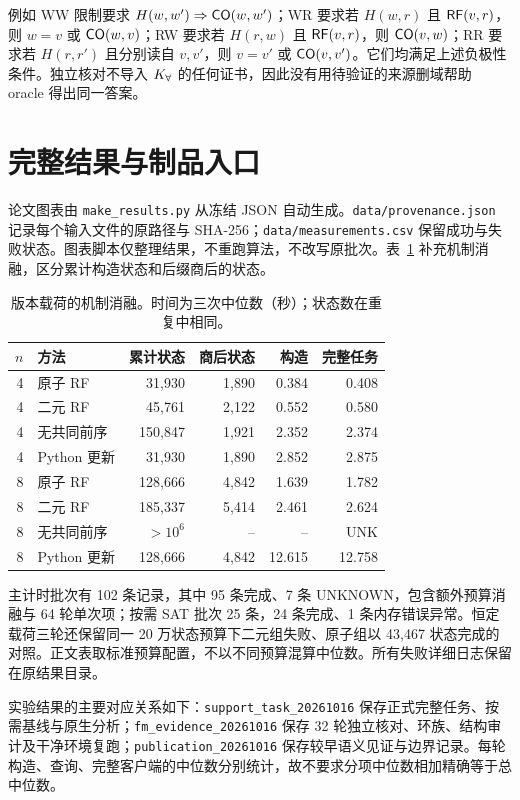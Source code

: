 例如 WW 限制要求 $H(w,w')\Rightarrow\mathsf{CO}(w,w')$；WR 要求若 $H(w,r)$ 且 $\mathsf{RF}(v,r)$，则 $w=v$ 或 $\mathsf{CO}(w,v)$；RW 要求若 $H(r,w)$ 且 $\mathsf{RF}(v,r)$，则 $\mathsf{CO}(v,w)$；RR 要求若 $H(r,r')$ 且分别读自 $v,v'$，则 $v=v'$ 或 $\mathsf{CO}(v,v')$。它们均满足上述负极性条件。独立核对不导入 $K_{\forall}$ 的任何证书，因此没有用待验证的来源删域帮助 oracle 得出同一答案。

\section{完整结果与制品入口}\label{app:artifact}
论文图表由 \texttt{make\_results.py} 从冻结 JSON 自动生成。\texttt{data/provenance.json} 记录每个输入文件的原路径与 SHA-256；\texttt{data/measurements.csv} 保留成功与失败状态。图表脚本仅整理结果，不重跑算法，不改写原批次。表~\ref{tab:ablation} 补充机制消融，区分累计构造状态和后缀商后的状态。

\begin{table}[ht]
\caption{版本载荷的机制消融。时间为三次中位数（秒）；状态数在重复中相同。}\label{tab:ablation}
\centering\small\begin{tabular}{rlrrrr}\toprule
$n$ & 方法 & 累计状态 & 商后状态 & 构造 & 完整任务\\\midrule
4 & 原子 RF & 31,930 & 1,890 & 0.384 & 0.408\\
4 & 二元 RF & 45,761 & 2,122 & 0.552 & 0.580\\
4 & 无共同前序 & 150,847 & 1,921 & 2.352 & 2.374\\
4 & Python 更新 & 31,930 & 1,890 & 2.852 & 2.875\\
8 & 原子 RF & 128,666 & 4,842 & 1.639 & 1.782\\
8 & 二元 RF & 185,337 & 5,414 & 2.461 & 2.624\\
8 & 无共同前序 & $>10^6$ & -- & -- & UNK\\
8 & Python 更新 & 128,666 & 4,842 & 12.615 & 12.758\\\bottomrule
\end{tabular}
\end{table}

主计时批次有 102 条记录，其中 95 条完成、7 条 UNKNOWN，包含额外预算消融与 64 轮单次项；按需 SAT 批次 25 条，24 条完成、1 条内存错误异常。恒定载荷三轮还保留同一 20 万状态预算下二元组失败、原子组以 43,467 状态完成的对照。正文表取标准预算配置，不以不同预算混算中位数。所有失败详细日志保留在原结果目录。

实验结果的主要对应关系如下：\texttt{support\_task\_20261016} 保存正式完整任务、按需基线与原生分析；\texttt{fm\_evidence\_20261016} 保存 32 轮独立核对、环族、结构审计及干净环境复跑；\texttt{publication\_20261016} 保存较早语义见证与边界记录。每轮构造、查询、完整客户端的中位数分别统计，故不要求分项中位数相加精确等于总中位数。


